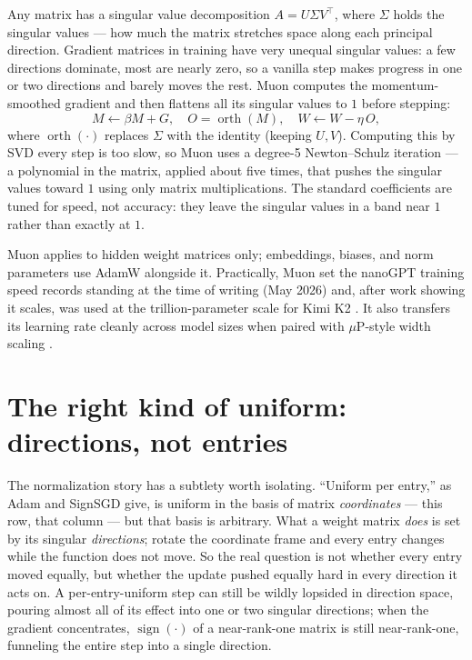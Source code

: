 \documentclass[10pt,conference]{IEEEtran}
\newcommand{\sign}{\operatorname{sign}}
\begin{document}
Any matrix has a singular value decomposition $A=U\Sigma V^\top$, where $\Sigma$
holds the singular values --- how much the matrix stretches space along each
principal direction. Gradient matrices in training have very unequal singular
values: a few directions dominate, most are nearly zero, so a vanilla step makes
progress in one or two directions and barely moves the rest. Muon computes the
momentum-smoothed gradient and then flattens all its singular values to $1$
before stepping:
\begin{equation}
M \leftarrow \beta M + G, \quad O = \operatorname{orth}(M), \quad
W \leftarrow W - \eta\, O,
\end{equation}
where $\operatorname{orth}(\cdot)$ replaces $\Sigma$ with the identity (keeping
$U,V$). Computing this by SVD every step is too slow, so Muon uses a degree-5
Newton--Schulz iteration --- a polynomial in the matrix, applied about five times,
that pushes the singular values toward $1$ using only matrix multiplications. The
standard coefficients are tuned for speed, not accuracy: they leave the singular
values in a band near $1$ rather than exactly at $1$.

Muon applies to hidden weight matrices only; embeddings, biases, and norm
parameters use AdamW alongside it. Practically, Muon set the nanoGPT training speed
records standing at the time of writing (May 2026) and, after work showing it scales, was used at the
trillion-parameter scale for Kimi K2 \cite{ref12}. It also transfers its learning
rate cleanly across model sizes when paired with $\mu$P-style width scaling
\cite{ref13}.

\section{The right kind of uniform: directions, not entries}
The normalization story has a subtlety worth isolating. ``Uniform per entry,''
as Adam and SignSGD give, is uniform in the basis of matrix \emph{coordinates}
--- this row, that column --- but that basis is arbitrary. What a weight matrix
\emph{does} is set by its singular \emph{directions}; rotate the coordinate frame
and every entry changes while the function does not move. So the real question is
not whether every entry moved equally, but whether the update pushed equally hard
in every direction it acts on. A per-entry-uniform step can still be wildly
lopsided in direction space, pouring almost all of its effect into one or two
singular directions; when the gradient concentrates, $\sign(\cdot)$ of a
near-rank-one matrix is still near-rank-one, funneling the entire step into a
single direction.
\end{document}
